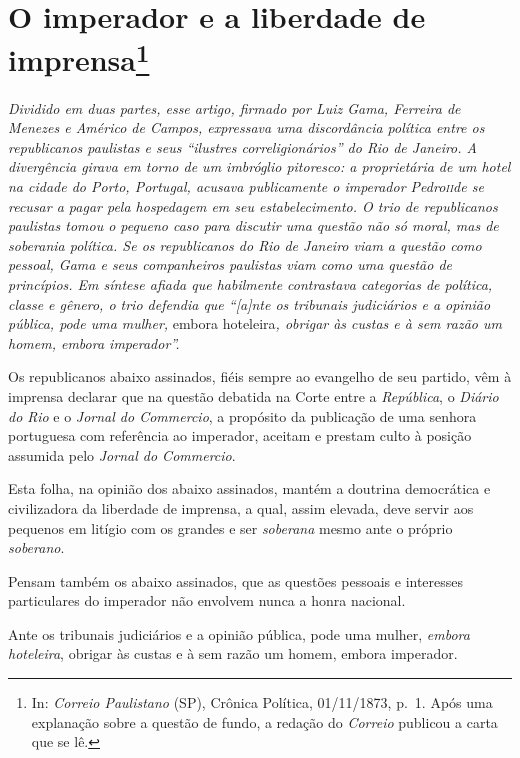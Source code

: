 \chapter{O imperador e a liberdade de imprensa\footnote{ In: \emph{Correio Paulistano} (SP), Crônica Política,
  01/11/1873, p.~1. Após uma explanação sobre a questão de fundo, a
  redação do \emph{Correio} publicou a carta que se lê.}} %

\begin{didascalia}
\emph{Dividido em duas partes, esse artigo, firmado por Luiz Gama,
Ferreira de Menezes e Américo de Campos, expressava uma discordância
política entre os republicanos paulistas e seus ``ilustres
correligionários'' do Rio de Janeiro. A divergência girava em torno de um
imbróglio pitoresco: a proprietária de um hotel na cidade do Porto,
Portugal, acusava publicamente o imperador Pedro\textsc{ii}de se recusar a
pagar pela hospedagem em seu estabelecimento. O trio de republicanos
paulistas tomou o pequeno caso para discutir uma questão não só moral,
mas de soberania política. Se os republicanos do Rio de Janeiro viam a
questão como pessoal, Gama e seus companheiros paulistas viam como uma
questão de princípios. Em síntese afiada que habilmente contrastava
categorias de política, classe e gênero, o trio defendia que ``{[}a{]}nte
os tribunais judiciários e a opinião pública, pode uma mulher,} embora
hoteleira\emph{, obrigar às custas e à sem razão um homem, embora
imperador''.}
\end{didascalia}

\asterisc{}

Os republicanos abaixo assinados, fiéis sempre ao evangelho de seu
partido, vêm à imprensa declarar que na questão debatida na Corte entre
a \emph{República}, o \emph{Diário do Rio} e o \emph{Jornal do
Commercio}, a propósito da publicação de uma senhora portuguesa com
referência ao imperador, aceitam e prestam culto à posição assumida pelo
\emph{Jornal do Commercio}.

Esta folha, na opinião dos abaixo assinados, mantém a doutrina
democrática e civilizadora da liberdade de imprensa, a qual, assim
elevada, deve servir aos pequenos em litígio com os grandes e ser
\emph{soberana} mesmo ante o próprio \emph{soberano}.

Pensam também os abaixo assinados, que as questões pessoais e interesses
particulares do imperador não envolvem nunca a honra nacional.

Ante os tribunais judiciários e a opinião pública, pode uma mulher,
\emph{embora hoteleira}, obrigar às custas e à sem razão um homem,
embora imperador.

